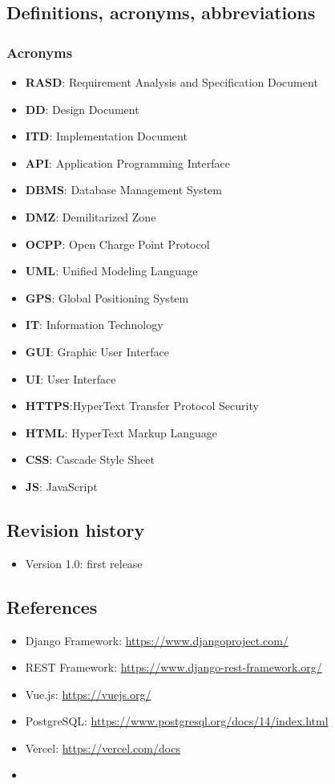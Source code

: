 \documentclass[table, 12pt]{article}
\begin{document}
\subsection{Definitions, acronyms, abbreviations}
\subsubsection*{Acronyms}
\begin{itemize}
    \item \textbf{RASD}: Requirement Analysis and Specification Document
    \item \textbf{DD}: Design Document
    \item \textbf{ITD}: Implementation Document
    \item \textbf{API}: Application Programming Interface
    \item \textbf{DBMS}: Database Management System
    \item \textbf{DMZ}: Demilitarized Zone
    \item \textbf{OCPP}: Open Charge Point Protocol
    \item \textbf{UML}: Unified Modeling Language
    \item \textbf{GPS}: Global Positioning System
    \item \textbf{IT}: Information Technology
    \item \textbf{GUI}: Graphic User Interface
    \item \textbf{UI}: User Interface
    \item \textbf{HTTPS}:HyperText Transfer Protocol Security
    \item \textbf{HTML}: HyperText Markup Language
    \item \textbf{CSS}: Cascade Style Sheet
    \item \textbf{JS}: JavaScript
\end{itemize}

\subsection{Revision history}
\begin{itemize}
    \item Version 1.0: first release
    
\end{itemize}

\subsection{References}
\begin{itemize}
    \item Django Framework: \url{https://www.djangoproject.com/}
    \item REST Framework: \url{https://www.django-rest-framework.org/}
    \item Vue.js: \url{https://vuejs.org/}
    \item PostgreSQL: \url{https://www.postgresql.org/docs/14/index.html}
    \item Vercel: \url{https://vercel.com/docs}
    \item 
\end{itemize}
\end{document}
